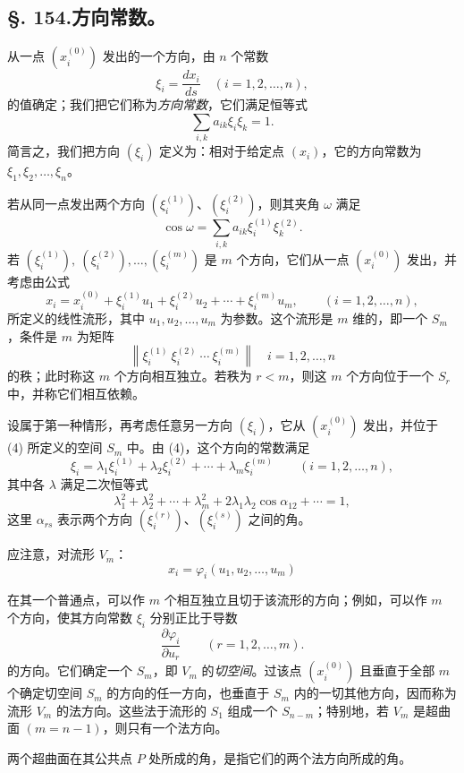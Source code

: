 \subsection*{\S. 154.\quad 方向常数。}

从一点 \((x_i^{(0)})\) 发出的一个方向，由 \(n\) 个常数
\[
 \xi_i=\frac{dx_i}{ds}\quad(i=1,2,\ldots,n),
\]
的值确定；我们把它们称为\emph{方向常数}，它们满足恒等式
\[
 \sum_{i,k}a_{ik}\xi_i\xi_k=1.
\]
简言之，我们把方向 \((\xi_i)\) 定义为：相对于给定点 \((x_i)\)，它的方向常数为 \(\xi_1,\xi_2,\ldots,\xi_n\)。

若从同一点发出两个方向 \((\xi_i^{(1)})\)、\((\xi_i^{(2)})\)，则其夹角 \(\omega\) 满足
\[
 \cos\omega=\sum_{i,k}a_{ik}\xi_i^{(1)}\xi_k^{(2)}.
\]
若 \((\xi_i^{(1)}),\ (\xi_i^{(2)}),\ldots,(\xi_i^{(m)})\) 是 \(m\) 个方向，它们从一点 \((x_i^{(0)})\) 发出，并考虑由公式
\begin{equation}\tag{4}
 x_i=x_i^{(0)}+\xi_i^{(1)}u_1+\xi_i^{(2)}u_2+\cdots+\xi_i^{(m)}u_m,
 \qquad (i=1,2,\ldots,n),
\end{equation}
所定义的线性流形，其中 \(u_1,u_2,\ldots,u_m\) 为参数。这个流形是 \(m\) 维的，即一个 \(S_m\)，条件是 \(m\) 为矩阵
\[
 \left\|\xi_i^{(1)}\ \xi_i^{(2)}\ \cdots\ \xi_i^{(m)}\right\|
 \quad i=1,2,\ldots,n
\]
的秩；此时称这 \(m\) 个方向相互独立。若秩为 \(r<m\)，则这 \(m\) 个方向位于一个 \(S_r\) 中，并称它们相互依赖。

设属于第一种情形，再考虑任意另一方向 \((\xi_i)\)，它从 \((x_i^{(0)})\) 发出，并位于 (4) 所定义的空间 \(S_m\) 中。由 (4)，这个方向的常数满足
\[
 \xi_i=\lambda_1\xi_i^{(1)}+\lambda_2\xi_i^{(2)}+\cdots+\lambda_m\xi_i^{(m)}
 \qquad(i=1,2,\ldots,n),
\]
其中各 \(\lambda\) 满足二次恒等式
\[
 \lambda_1^2+\lambda_2^2+\cdots+\lambda_m^2+2\lambda_1\lambda_2\cos\alpha_{12}+\cdots=1,
\]
这里 \(\alpha_{rs}\) 表示两个方向 \((\xi_i^{(r)})\)、\((\xi_i^{(s)})\) 之间的角。

应注意，对流形 \(V_m\)：
\[
 x_i=\varphi_i(u_1,u_2,\ldots,u_m)
\]

在其一个普通点，可以作 \(m\) 个相互独立且切于该流形的方向；例如，可以作 \(m\) 个方向，使其方向常数 \(\xi_i\) 分别正比于导数
\[
 \frac{\partial \varphi_i}{\partial u_r}\qquad (r=1,2,\ldots,m).
\]
的方向。它们确定一个 \(S_m\)，即 \(V_m\) 的\emph{切空间}。过该点 \((x_i^{(0)})\) 且垂直于全部 \(m\) 个确定切空间 \(S_m\) 的方向的任一方向，也垂直于 \(S_m\) 内的一切其他方向，因而称为流形 \(V_m\) 的法方向。这些法于流形的 \(S_1\) 组成一个 \(S_{n-m}\)；特别地，若 \(V_m\) 是超曲面 \((m=n-1)\)，则只有一个法方向。

两个超曲面在其公共点 \(P\) 处所成的角，是指它们的两个法方向所成的角。

